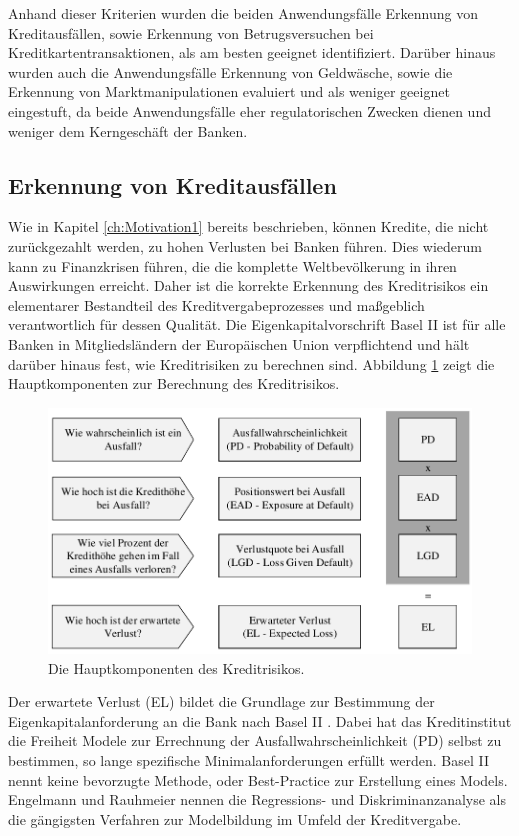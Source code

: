 Anhand dieser Kriterien wurden die beiden Anwendungsfälle Erkennung von Kreditausfällen, sowie Erkennung von Betrugsversuchen bei Kreditkartentransaktionen, als am besten geeignet identifiziert. Darüber hinaus wurden auch die Anwendungsfälle Erkennung von Geldwäsche, sowie die Erkennung von Marktmanipulationen evaluiert und als weniger geeignet eingestuft, da beide Anwendungsfälle eher regulatorischen Zwecken dienen und weniger dem Kerngeschäft der Banken.   

\subsection{Erkennung von Kreditausfällen}
\label{subsec:Kreditausfallen3}

Wie in Kapitel \ref{ch:Motivation1} bereits beschrieben, können Kredite, die nicht zurückgezahlt werden, zu hohen Verlusten bei Banken führen. Dies wiederum kann zu Finanzkrisen führen, die die komplette Weltbevölkerung in ihren Auswirkungen erreicht. Daher ist die korrekte Erkennung des Kreditrisikos ein elementarer Bestandteil des Kreditvergabeprozesses und maßgeblich verantwortlich für dessen Qualität. Die Eigenkapitalvorschrift Basel II ist für alle Banken in Mitgliedsländern der Europäischen Union verpflichtend \cite{RE13} und hält darüber hinaus fest, wie Kreditrisiken zu berechnen sind. Abbildung \ref{fig:creditriskdimensions} \cite{GK10} zeigt die Hauptkomponenten zur Berechnung des Kreditrisikos. 

\begin{figure}[ht]
\centering
\includegraphics{images/creditriskdimensions.pdf}
\caption{Die Hauptkomponenten des Kreditrisikos.}
\label{fig:creditriskdimensions}
\end{figure}   

Der erwartete Verlust (EL) bildet die Grundlage zur Bestimmung der Eigenkapitalanforderung an die Bank nach Basel II \cite[vgl. S. 31]{ER11}. Dabei hat das Kreditinstitut die Freiheit Modele zur Errechnung der Ausfallwahrscheinlichkeit (PD) selbst zu bestimmen, so lange spezifische Minimalanforderungen erfüllt werden. Basel II nennt keine bevorzugte Methode, oder Best-Practice zur Erstellung eines Models. Engelmann und Rauhmeier \cite{ER11} nennen die Regressions- und Diskriminanzanalyse als die gängigsten Verfahren zur Modelbildung im Umfeld der Kreditvergabe. 

